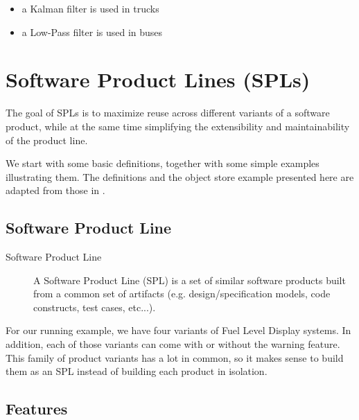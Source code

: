 \documentclass[11pt]{article}
\begin{document}
\begin{itemize}
\item a Kalman filter is used in trucks
\item a Low-Pass filter is used in buses
\end{itemize}

\section{Software Product Lines (SPLs)}


The goal of SPLs is to maximize reuse across different variants of a software product, while at the same time simplifying the extensibility and maintainability of the product line.

We start with some basic definitions, together with some simple examples illustrating them. The definitions and the object store example presented here are adapted from those in \cite{Thum}.

\subsection{Software Product Line}

\begin{description}

\item[Software Product Line]
A Software Product Line (SPL) is a set of similar software products built from a common set of artifacts (e.g. design/specification models, code constructs, test cases, etc...).

\end{description}

For our running example, we have four variants of Fuel Level Display systems. In addition, each of those variants can come with or without the warning feature. This family of product variants has a lot in common, so it makes sense to build them as an SPL instead of building each product in isolation.

\subsection{Features}
\end{document}
